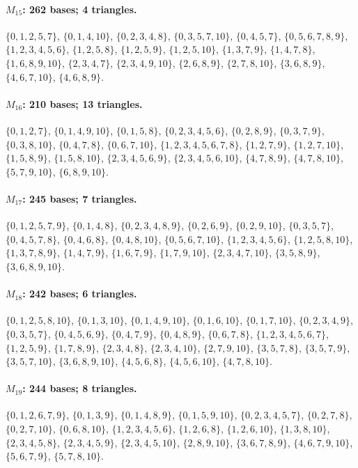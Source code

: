 \paragraph{$M_{15}$: 262 bases; 4 triangles.}
\(\{0,1,2,5,7\}\), \(\{0,1,4,10\}\), \(\{0,2,3,4,8\}\), \(\{0,3,5,7,10\}\), \(\{0,4,5,7\}\), \(\{0,5,6,7,8,9\}\), \(\{1,2,3,4,5,6\}\), \(\{1,2,5,8\}\), \(\{1,2,5,9\}\), \(\{1,2,5,10\}\), \(\{1,3,7,9\}\), \(\{1,4,7,8\}\), \(\{1,6,8,9,10\}\), \(\{2,3,4,7\}\), \(\{2,3,4,9,10\}\), \(\{2,6,8,9\}\), \(\{2,7,8,10\}\), \(\{3,6,8,9\}\), \(\{4,6,7,10\}\), \(\{4,6,8,9\}\).

\paragraph{$M_{16}$: 210 bases; 13 triangles.}
\(\{0,1,2,7\}\), \(\{0,1,4,9,10\}\), \(\{0,1,5,8\}\), \(\{0,2,3,4,5,6\}\), \(\{0,2,8,9\}\), \(\{0,3,7,9\}\), \(\{0,3,8,10\}\), \(\{0,4,7,8\}\), \(\{0,6,7,10\}\), \(\{1,2,3,4,5,6,7,8\}\), \(\{1,2,7,9\}\), \(\{1,2,7,10\}\), \(\{1,5,8,9\}\), \(\{1,5,8,10\}\), \(\{2,3,4,5,6,9\}\), \(\{2,3,4,5,6,10\}\), \(\{4,7,8,9\}\), \(\{4,7,8,10\}\), \(\{5,7,9,10\}\), \(\{6,8,9,10\}\).

\paragraph{$M_{17}$: 245 bases; 7 triangles.}
\(\{0,1,2,5,7,9\}\), \(\{0,1,4,8\}\), \(\{0,2,3,4,8,9\}\), \(\{0,2,6,9\}\), \(\{0,2,9,10\}\), \(\{0,3,5,7\}\), \(\{0,4,5,7,8\}\), \(\{0,4,6,8\}\), \(\{0,4,8,10\}\), \(\{0,5,6,7,10\}\), \(\{1,2,3,4,5,6\}\), \(\{1,2,5,8,10\}\), \(\{1,3,7,8,9\}\), \(\{1,4,7,9\}\), \(\{1,6,7,9\}\), \(\{1,7,9,10\}\), \(\{2,3,4,7,10\}\), \(\{3,5,8,9\}\), \(\{3,6,8,9,10\}\).

\paragraph{$M_{18}$: 242 bases; 6 triangles.}
\(\{0,1,2,5,8,10\}\), \(\{0,1,3,10\}\), \(\{0,1,4,9,10\}\), \(\{0,1,6,10\}\), \(\{0,1,7,10\}\), \(\{0,2,3,4,9\}\), \(\{0,3,5,7\}\), \(\{0,4,5,6,9\}\), \(\{0,4,7,9\}\), \(\{0,4,8,9\}\), \(\{0,6,7,8\}\), \(\{1,2,3,4,5,6,7\}\), \(\{1,2,5,9\}\), \(\{1,7,8,9\}\), \(\{2,3,4,8\}\), \(\{2,3,4,10\}\), \(\{2,7,9,10\}\), \(\{3,5,7,8\}\), \(\{3,5,7,9\}\), \(\{3,5,7,10\}\), \(\{3,6,8,9,10\}\), \(\{4,5,6,8\}\), \(\{4,5,6,10\}\), \(\{4,7,8,10\}\).

\paragraph{$M_{19}$: 244 bases; 8 triangles.}
\(\{0,1,2,6,7,9\}\), \(\{0,1,3,9\}\), \(\{0,1,4,8,9\}\), \(\{0,1,5,9,10\}\), \(\{0,2,3,4,5,7\}\), \(\{0,2,7,8\}\), \(\{0,2,7,10\}\), \(\{0,6,8,10\}\), \(\{1,2,3,4,5,6\}\), \(\{1,2,6,8\}\), \(\{1,2,6,10\}\), \(\{1,3,8,10\}\), \(\{2,3,4,5,8\}\), \(\{2,3,4,5,9\}\), \(\{2,3,4,5,10\}\), \(\{2,8,9,10\}\), \(\{3,6,7,8,9\}\), \(\{4,6,7,9,10\}\), \(\{5,6,7,9\}\), \(\{5,7,8,10\}\).


